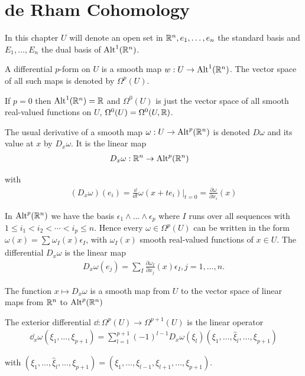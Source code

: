 \chapter{de Rham Cohomology}
In this chapter $U$ will denote an open set in ${\mathbb{R}}^n, {e_1,\ldots, e_n}$ the standard basis
and ${E_1, \ldots,E_n}$ the dual basis of $\operatorname{Alt}^1({\mathbb{R}}^n)$.

\begin{definition}
  A differential $p$-form on $U$ is a smooth map $w:U\to \operatorname{Alt}^1({\mathbb{R}}^n)$.
The vector space of all such maps is denoted by $\Omega^p(U)$.
\end{definition}

If $p = 0$ then $\operatorname{Alt}^1({\mathbb{R}}^n) = {\mathbb{R}}$ and $\Omega^0(U)$ is just the vector space of all smooth
real-valued functions on $U$, $\Omega^0(U) = \Omega^0(U, {\mathbb{R}})$.

The usual derivative of a smooth map $\omega:U\to\operatorname{Alt}^p({\mathbb{R}}^n)$ is denoted $D\omega$ and its
value at $x$ by $D_x\omega$. It is the linear map
\begin{align*}
  D_x\omega:{\mathbb{R}}^n &\to \operatorname{Alt}^p({\mathbb{R}}^n)
\end{align*}

with 
\begin{align*}
  (D_x\omega)(e_i) 
  = \frac{\dd }{\dd t}\omega(x+te_i)\Big|_{t=0}
  = \frac{\partial \omega}{\partial x_i}(x)
\end{align*}

In $\operatorname{Alt}^p({\mathbb{R}}^n)$ we have the basis $\epsilon_1\wedge\ldots\wedge\epsilon_p$ where 
$I$ runs over all sequences with $1\le i_1<i_2<\cdots<i_p\le n$. Hence every $\omega\in\Omega^p(U)$ 
can be written in the form $\omega(x) = \sum_{}^{}{\omega_I(x)\epsilon_I}$, with $\omega_I(x)$ smooth 
real-valued functions of $x\in U$. The differential $D_x\omega$ is the linear map
\begin{align}\label{eq:3-1}
  D_{x}\omega(e_{j})=\sum_{I}\frac{\partial\omega_{I}}{\partial x_{j}}(x)\epsilon_{I} , j=1,\ldots,n.
\end{align}

The function $x\mapsto D_x\omega$ is a smooth map from $U$ to the vector space of linear
maps from ${\mathbb{R}}^n$ to $\operatorname{Alt}^p({\mathbb{R}}^n)$


\begin{definition}\label{definition:3-2}
  The exterior differential $\dd:\Omega^p(U)\to \Omega^{p+1}(U)$ is 
  the linear operator
  \begin{align*}
    \dd_x\omega(\xi_1,\ldots,\xi_{p+1})
    = \sum_{l=1}^{p+1}\left(-1\right)^{l-1}D_x\omega(\xi_l)(\xi_1,\ldots,\hat{\xi}_l,\ldots,\xi_{p+1})
  \end{align*}

  with $(\xi_1,\ldots,\hat{\xi}_l,\ldots,\xi_{p+1}) = (\xi_1, \ldots, \xi_{l-1}, \xi_{l+1}, \ldots, \xi_{p+1})$.
\end{definition}


